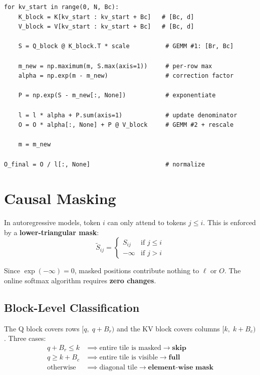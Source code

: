 \documentclass[11pt, letterpaper]{article}
\begin{document}
\begin{lstlisting}[style=python]
for kv_start in range(0, N, Bc):
    K_block = K[kv_start : kv_start + Bc]   # [Bc, d]
    V_block = V[kv_start : kv_start + Bc]   # [Bc, d]

    S = Q_block @ K_block.T * scale          # GEMM #1: [Br, Bc]

    m_new = np.maximum(m, S.max(axis=1))     # per-row max
    alpha = np.exp(m - m_new)                # correction factor

    P = np.exp(S - m_new[:, None])           # exponentiate

    l = l * alpha + P.sum(axis=1)            # update denominator
    O = O * alpha[:, None] + P @ V_block     # GEMM #2 + rescale

    m = m_new

O_final = O / l[:, None]                     # normalize
\end{lstlisting}

\section{Causal Masking}

In autoregressive models, token $i$ can only attend to tokens $j \leq i$. This is enforced by a \textbf{lower-triangular mask}:
\[
\tilde{S}_{ij} =
\begin{cases}
S_{ij} & \text{if } j \leq i \\
-\infty & \text{if } j > i
\end{cases}
\]

Since $\exp(-\infty) = 0$, masked positions contribute nothing to $\ell$ or $O$. The online softmax algorithm requires \textbf{zero changes}.

\subsection{Block-Level Classification}

The Q block covers rows $[q,\; q + B_r)$ and the KV block covers columns $[k,\; k + B_c)$. Three cases:
\begin{align}
q + B_r \leq k &\implies \text{entire tile is masked} \rightarrow \textbf{skip} \\
q \geq k + B_c &\implies \text{entire tile is visible} \rightarrow \textbf{full} \\
\text{otherwise} &\implies \text{diagonal tile} \rightarrow \textbf{element-wise mask}
\end{align}
\end{document}
